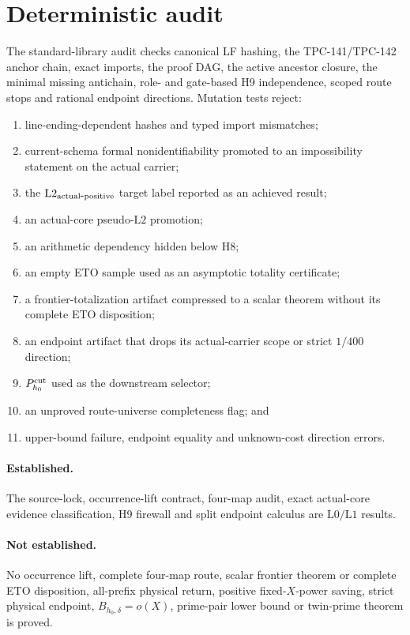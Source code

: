 \documentclass[11pt]{article}
\theoremstyle{definition}
\theoremstyle{remark}
\newcommand{\Lzero}{\mathrm{L0}}
\newcommand{\Lone}{\mathrm{L1}}
\newcommand{\Ltwo}{\mathrm{L2}}
\newcommand{\Bhard}{B_{h_0,\delta}}
\begin{document}
\section{Deterministic audit}

The standard-library audit checks canonical LF hashing, the
TPC-141/TPC-142 anchor chain, exact imports, the proof DAG, the active
ancestor closure, the minimal missing antichain, role- and gate-based
H9 independence, scoped route stops and rational endpoint directions.
Mutation tests reject:
\begin{enumerate}[leftmargin=2em]
\item line-ending-dependent hashes and typed import mismatches;
\item current-schema formal nonidentifiability promoted to an
  impossibility statement on the actual carrier;
\item the \(\Ltwo_{\rm actual\mbox{-}positive}\) target label reported
  as an achieved result;
\item an actual-core pseudo-\(\Ltwo\) promotion;
\item an arithmetic dependency hidden below H8;
\item an empty ETO sample used as an asymptotic totality certificate;
\item a frontier-totalization artifact compressed to a scalar theorem
  without its complete ETO disposition;
\item an endpoint artifact that drops its actual-carrier scope or
  strict \(1/400\) direction;
\item \(P_{h_0}^{\rm cut}\) used as the downstream selector;
\item an unproved route-universe completeness flag; and
\item upper-bound failure, endpoint equality and unknown-cost direction
  errors.
\end{enumerate}

\paragraph{Established.}
The source-lock, occurrence-lift contract, four-map audit, exact
actual-core evidence classification, H9 firewall and split endpoint
calculus are \(\Lzero/\Lone\) results.

\paragraph{Not established.}
No occurrence lift, complete four-map route, scalar frontier theorem
or complete ETO disposition, all-prefix physical return, positive
fixed-\(X\)-power saving,
strict physical endpoint, \(\Bhard=o(X)\), prime-pair lower bound or
twin-prime theorem is proved.
\end{document}
